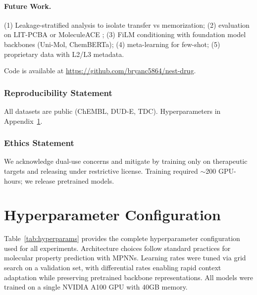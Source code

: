 \documentclass{article}
\begin{document}
\paragraph{Future Work.} (1) Leakage-stratified analysis to isolate transfer vs memorization; (2) evaluation on LIT-PCBA \citep{tran_2020_litpcba} or MoleculeACE \citep{van_tilborg_2024_moleculeace}; (3) FiLM conditioning with foundation model backbones (Uni-Mol, ChemBERTa); (4) meta-learning for few-shot; (5) proprietary data with L2/L3 metadata.

Code is available at \url{https://github.com/bryanc5864/nest-drug}.

\subsubsection*{Reproducibility Statement}
All datasets are public (ChEMBL, DUD-E, TDC). Hyperparameters in Appendix~\ref{app:hyperparams}.

\subsubsection*{Ethics Statement}
We acknowledge dual-use concerns and mitigate by training only on therapeutic targets and releasing under restrictive license. Training required $\sim$200 GPU-hours; we release pretrained models.




\appendix

\section{Hyperparameter Configuration}
\label{app:hyperparams}

Table~\ref{tab:hyperparams} provides the complete hyperparameter configuration used for all experiments. Architecture choices follow standard practices for molecular property prediction with MPNNs. Learning rates were tuned via grid search on a validation set, with differential rates enabling rapid context adaptation while preserving pretrained backbone representations. All models were trained on a single NVIDIA A100 GPU with 40GB memory.
\end{document}

